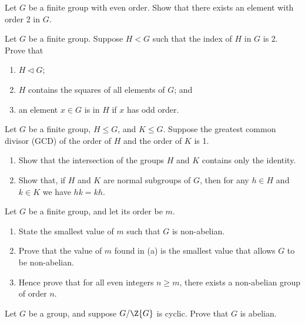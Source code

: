 \begin{problem}
    Let $G$ be a finite group with even order. Show that there exists an element with order 2 in $G$.
\end{problem}

\begin{problem}\label{problem-subgroup-of-index-2}
    Let $G$ be a finite group. Suppose $H < G$ such that the index of $H$ in $G$ is 2. Prove that
    \begin{enumerate}[label=(\roman*)]
        \item $H \lhd G$;
        \item $H$ contains the squares of all elements of $G$; and
        \item an element $x \in G$ is in $H$ if $x$ has odd order.
    \end{enumerate}
\end{problem}

\newpage

\begin{problem}\label{problem-intersection-of-coprime-subgroups}
    Let $G$ be a finite group, $H \leq G$, and $K \leq G$. Suppose the greatest common divisor (GCD) of the order of $H$ and the order of $K$ is 1.
    \begin{enumerate}[label=(\alph*)]
        \item Show that the intersection of the groups $H$ and $K$ contains only the identity.
        \item Show that, if $H$ and $K$ are normal subgroups of $G$, then for any $h \in H$ and $k \in K$ we have $hk = kh$.
    \end{enumerate}
\end{problem}

\begin{problem}\label{problem-smallest-nonabelian-group}
    Let $G$ be a finite group, and let its order be $m$.
    \begin{enumerate}[label=(\alph*)]
        \item State the smallest value of $m$ such that $G$ is non-abelian.
        \item Prove that the value of $m$ found in (a) is the smallest value that allows $G$ to be non-abelian.
        \item Hence prove that for all even integers $n \geq m$, there exists a non-abelian group of order $n$.
    \end{enumerate}
\end{problem}

\begin{problem}\label{problem-quotient-of-group-mod-center-is-cyclic-implies-abelian}
    Let $G$ be a group, and suppose $G / \Z{G}$ is cyclic. Prove that $G$ is abelian.
\end{problem}

